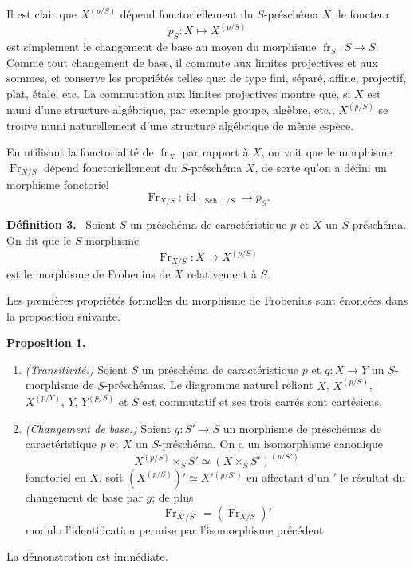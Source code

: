 \documentclass[11pt]{article}
\newenvironment{statement}[1]{\par\medskip\noindent\textbf{#1.}\ }{\par\medskip}
\providecommand{\id}{\operatorname{id}}
\providecommand{\id}{\operatorname{id}}
\providecommand{\id}{\operatorname{id}}
\providecommand{\id}{\operatorname{id}}
\providecommand{\id}{\operatorname{id}}
\providecommand{\fr}{\operatorname{fr}}
\providecommand{\Fr}{\operatorname{Fr}}
\providecommand{\Sch}{\operatorname{Sch}}
\providecommand{\Fr}{\operatorname{Fr}}
\providecommand{\fr}{\operatorname{fr}}
\providecommand{\Sch}{\operatorname{Sch}}
\providecommand{\id}{\operatorname{id}}
\begin{document}
Il est clair que $X^{(p/S)}$ dépend fonctoriellement du $S$-préschéma $X$; le foncteur
\[
p_S:X\longmapsto X^{(p/S)}
\]
est simplement le changement de base au moyen du morphisme $\fr_S:S\to S$. Comme tout changement de base, il commute aux limites projectives et aux sommes, et conserve les propriétés telles que: de type fini, séparé, affine, projectif, plat, étale, etc. La commutation aux limites projectives montre que, si $X$ est muni d'une structure algébrique, par exemple groupe, algèbre, etc., $X^{(p/S)}$ se trouve muni naturellement d'une structure algébrique de même espèce.

En utilisant la fonctorialité de $\fr_X$ par rapport à $X$, on voit que le morphisme $\Fr_{X/S}$ dépend fonctoriellement du $S$-préschéma $X$, de sorte qu'on a défini un morphisme fonctoriel
\[
\Fr_{X/S}:\id_{(\Sch)/S}\longrightarrow p_S.
\]

\begin{statement}{Définition 3}
Soient $S$ un préschéma de caractéristique $p$ et $X$ un $S$-préschéma. On dit que le $S$-morphisme
\[
\Fr_{X/S}:X\longrightarrow X^{(p/S)}
\]
est le morphisme de Frobenius de $X$ relativement à $S$.
\end{statement}

Les premières propriétés formelles du morphisme de Frobenius sont énoncées dans la proposition suivante.

\begin{statement}{Proposition 1}
\begin{enumerate}[label=\alph*)]
\item \emph{(Transitivité.)} Soient $S$ un préschéma de caractéristique $p$ et $g:X\to Y$ un $S$-morphisme de $S$-préschémas. Le diagramme naturel reliant $X$, $X^{(p/S)}$, $X^{(p/Y)}$, $Y$, $Y^{(p/S)}$ et $S$ est commutatif et ses trois carrés sont cartésiens.

\item \emph{(Changement de base.)} Soient $g:S'\to S$ un morphisme de préschémas de caractéristique $p$ et $X$ un $S$-préschéma. On a un isomorphisme canonique
\[
X^{(p/S)}\times_S S'\simeq (X\times_S S')^{(p/S')}
\]
fonctoriel en $X$, soit $(X^{(p/S)})'\simeq X'{}^{(p/S')}$ en affectant d'un $'$ le résultat du changement de base par $g$; de plus
\[
\Fr_{X'/S'}=(\Fr_{X/S})'
\]
modulo l'identification permise par l'isomorphisme précédent.
\end{enumerate}
\end{statement}

La démonstration est immédiate.
\end{document}
